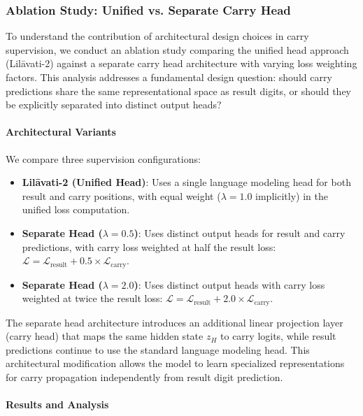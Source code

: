 \subsubsection{Ablation Study: Unified vs. Separate Carry Head}

To understand the contribution of architectural design choices in carry supervision, we conduct an ablation study comparing the unified head approach (Lil\={a}vati-2) against a separate carry head architecture with varying loss weighting factors. This analysis addresses a fundamental design question: should carry predictions share the same representational space as result digits, or should they be explicitly separated into distinct output heads?

\paragraph{Architectural Variants}

We compare three supervision configurations:
\begin{itemize}
\item \textbf{Lil\={a}vati-2 (Unified Head)}: Uses a single language modeling head for both result and carry positions, with equal weight ($\lambda = 1.0$ implicitly) in the unified loss computation.
\item \textbf{Separate Head ($\lambda = 0.5$)}: Uses distinct output heads for result and carry predictions, with carry loss weighted at half the result loss: $\mathcal{L} = \mathcal{L}_{\text{result}} + 0.5 \times \mathcal{L}_{\text{carry}}$.
\item \textbf{Separate Head ($\lambda = 2.0$)}: Uses distinct output heads with carry loss weighted at twice the result loss: $\mathcal{L} = \mathcal{L}_{\text{result}} + 2.0 \times \mathcal{L}_{\text{carry}}$.
\end{itemize}

The separate head architecture introduces an additional linear projection layer (carry head) that maps the same hidden state $z_H$ to carry logits, while result predictions continue to use the standard language modeling head. This architectural modification allows the model to learn specialized representations for carry propagation independently from result digit prediction.

\paragraph{Results and Analysis}

